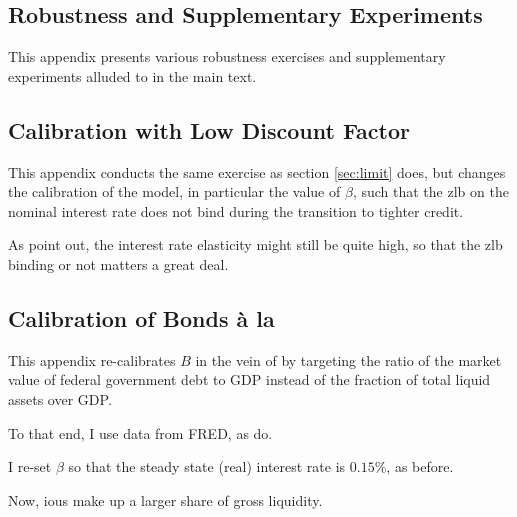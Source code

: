 \documentclass[12pt]{article} %
\numberwithin{equation}{section} %
\numberwithin{figure}{section}
\numberwithin{table}{section}
\begin{document}
\begin{refsection}
\begin{appendices}
\thispagestyle{plain}
\section{Robustness and Supplementary Experiments}
\label{sec-app:robust}

This appendix presents various robustness exercises and supplementary experiments alluded to in the main text.

\subsection{Calibration with Low Discount Factor}
\label{sec-app:robust-beta-calibration}

This appendix conducts the same exercise as section \ref{sec:limit} does, but changes the calibration of the model, in particular the value of $\beta$, such that the \Gls{zlb} on the nominal interest rate does not bind during the transition to tighter credit.

As \textcite{gl2017} point out, the interest rate elasticity might still be quite high, so that the \Gls{zlb} binding or not matters a great deal.

\subsection{Calibration of Bonds à la \textcite{bayer2023}}
\label{sec-app:robust-bonds}

This appendix re-calibrates $B$ in the vein of \textcite{bayer2023} by targeting the ratio of the market value of federal government debt to GDP instead of the fraction of total liquid assets over GDP.

To that end, I use data from FRED, as \textcite{bayer2023} do.

I re-set $\beta$ so that the steady state (real) interest rate is $0.15\%$, as before.

Now, \Gls{iou}s make up a larger share of gross liquidity. 


\end{appendices}
\end{refsection}
\end{document}
